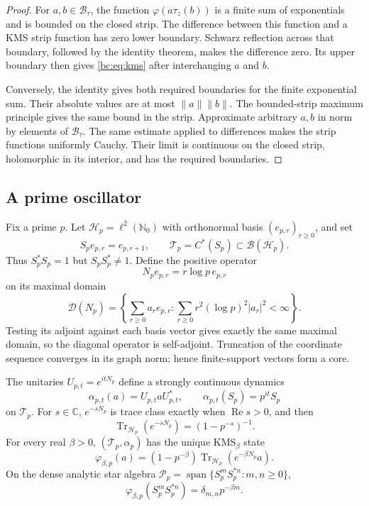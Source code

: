 \begin{proof}
For \(a,b\in\mathcal B_\tau\), the function
\(\varphi(a\tau_z(b))\) is a finite sum of exponentials and is bounded
on the closed strip. The difference between this function and a KMS
strip function has zero lower boundary. Schwarz reflection across that
boundary, followed by the identity theorem, makes the difference zero.
Its upper boundary then gives \eqref{bc:eq:kms} after interchanging
\(a\) and \(b\).

Conversely, the identity gives both required boundaries for the finite
exponential sum. Their absolute values are at most \(\|a\|\|b\|\).
The bounded-strip maximum principle gives the same bound in the strip.
Approximate arbitrary \(a,b\) in norm by elements of \(\mathcal B_\tau\).
The same estimate applied to differences makes the strip functions
uniformly Cauchy. Their limit is continuous on the closed strip,
holomorphic in its interior, and has the required boundaries.
\end{proof}

\subsection{A prime oscillator}

Fix a prime \(p\).  Let \(\mathscr H_p=\ell^2(\mathbb N_0)\) with
orthonormal basis \((e_{p,r})_{r\geq0}\), and set
\[
 S_pe_{p,r}=e_{p,r+1},\qquad \mathcal T_p=C^*(S_p)
 \subset\mathcal B(\mathscr H_p).
\]
Thus \(S_p^*S_p=1\) but \(S_pS_p^*\ne1\).  Define the positive operator
\[
 N_pe_{p,r}=r\log p\,e_{p,r}
\]
on its maximal domain
\[
 \mathcal D(N_p)=
 \left\{\sum_{r\geq0}a_re_{p,r}:
 \sum_{r\geq0}r^2(\log p)^2|a_r|^2<\infty\right\}.
\]
Testing its adjoint against each basis vector gives exactly the same
maximal domain, so the diagonal operator is self-adjoint. Truncation of
the coordinate sequence converges in its graph norm; hence finite-support
vectors form a core.

\begin{proposition}
\label{prop:prime-kms}
The unitaries \(U_{p,t}=e^{itN_p}\) define a strongly continuous dynamics
\[
 \alpha_{p,t}(a)=U_{p,t}aU_{p,t}^*,\qquad
 \alpha_{p,t}(S_p)=p^{it}S_p
\]
on \(\mathcal T_p\).  For \(s\in\mathbb C\),
\(e^{-sN_p}\) is trace class exactly when \(\operatorname{Re}s>0\), and
then
\[
 \operatorname{Tr}_{\mathscr H_p}(e^{-sN_p})=(1-p^{-s})^{-1}.
\]
For every real \(\beta>0\), \((\mathcal T_p,\alpha_p)\) has the unique
KMS\(_\beta\) state
\[
 \varphi_{\beta,p}(a)
 =(1-p^{-\beta})
 \operatorname{Tr}_{\mathscr H_p}(e^{-\beta N_p}a).
\]
On the dense analytic star algebra
\(\mathcal P_p=\operatorname{span}\{S_p^mS_p^{*n}:m,n\geq0\}\),
\[
 \varphi_{\beta,p}(S_p^mS_p^{*n})
 =\delta_{m,n}p^{-\beta m}.
\]
\end{proposition}

